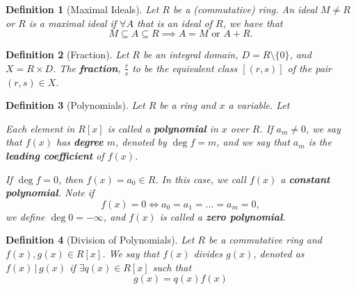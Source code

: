 \documentclass[9pt,landscape,a4paper]{article}
\newcommand{\hldefn}[1]{\textcolor{base16-eighties-magenta}{\textbf{#1}}}
\newcommand{\hlnoteb}[1]{\textcolor{base16-eighties-magenta}{\textbf{#1}}}
\theoremstyle{empty}
\newtheorem{defn}{Definition}
\begin{document}
\begin{multicols*}{5}
\begin{defn}[Maximal Ideals]
\label{defn:maximal_ideals}
  Let $R$ be a (commutative) ring. An ideal $M \neq R$ or $R$ is a maximal ideal if $\forall A$ that is an ideal of $R$, we have that
  \begin{equation*}
    M \subseteq A \subseteq R \implies A = M \text{ or } A + R.
  \end{equation*}
\end{defn}

\begin{defn}[Fraction]
\label{defn:fraction}
  Let $R$ be an integral domain, $D = R \setminus \{0\}$, and $X = R \times D$. The \hlnoteb{fraction}, $\frac{r}{s}$ to be the equivalent class $[(r, s)]$ of the pair $(r, s) \in X$.
\end{defn}

\begin{defn}[Polynomials]
\label{defn:polynomials}
  Let $R$ be a ring and $x$ a variable. Let


  Each element in $R[x]$ is called a \hldefn{polynomial} in $x$ over $R$. If $a_m \neq 0$, we say that $f(x)$ has \hldefn{degree} $m$, denoted by $\deg f = m$, and we say that $a_m$ is the \hldefn{leading coefficient} of $f(x)$.

  If $\deg f = 0$, then $f(x) = a_0 \in R$. In this case, we call $f(x)$ a \hldefn{constant polynomial}. Note if
  \begin{equation*}
    f(x) = 0 \iff a_0 = a_1 = ... = a_m = 0,
  \end{equation*}
  we define $\deg 0 = - \infty$, and $f(x)$ is called a \hldefn{zero polynomial}.
\end{defn}

\begin{defn}[Division of Polynomials]
\label{defn:division_of_polynomials}
  Let $R$ be a commutative ring and $f(x), g(x) \in R[x]$. We say that $f(x)$ divides $g(x)$, denoted as $f(x) \, | \, g(x)$ if $\exists q(x) \in R[x]$ such that
  \begin{equation*}
    g(x) = q(x) f(x)
  \end{equation*}
\end{defn}


\end{multicols*}
\end{document}
